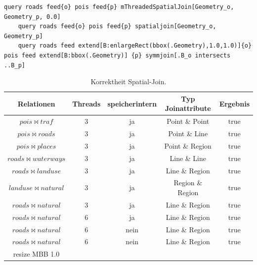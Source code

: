 \documentclass[a4paper,12pt,twoside]{article}
\newcommand{\Fb}[1]{\textit{#1}} %
\begin{document}
\begin{minipage}{0.95\textwidth}
	\begin{lstlisting}[caption={Beispiel Testqueries für den Spatial-Join-Operator ohne \Fb{project} und \Fb{sortby}.}, label=list:testspatialjoin]
	query roads feed{o} pois feed{p} mThreadedSpatialJoin[Geometry_o, Geometry_p, 0.0]
	query roads feed{o} pois feed{p} spatialjoin[Geometry_o, Geometry_p]
	query roads feed extend[B:enlargeRect(bbox(.Geometry),1.0,1.0)]{o} pois feed extend[B:bbox(.Geometry)] {p} symmjoin[.B_o intersects ..B_p]
	\end{lstlisting}
\end{minipage}


\begin{table}
	\centering
	\begin{tabular}{|c|c|c|c|c|}
		\hline
		\rowcolor{gray!30} 
		Relationen & Threads & speicherintern & Typ Joinattribute & Ergebnis \\ 
		\hline 
		$pois \bowtie traf$ & 3 & ja & Point \& Point & true \\ 
		\hline 
		$pois \bowtie roads$ & 3 & ja & Point \& Line & true \\ 
		\hline
		$pois \bowtie places$ & 3 & ja & Point \& Region & true \\ 
		\hline
		$roads \bowtie waterways$ & 3 & ja & Line \& Line & true \\ 
		\hline
		$roads \bowtie landuse$ & 3 & ja & Line \& Region & true \\ 
		\hline
		$landuse \bowtie natural$ & 3 & ja & Region \& Region & true \\ 
		\hline
		$roads \bowtie natural$ & 3 & ja & Line \& Region & true \\ 
		\hline
		$roads \bowtie natural$ & 6 & ja & Line \& Region & true \\ 
		\hline
		$roads \bowtie natural$ & 6 & nein & Line \& Region & true \\ 
		\hline
		$roads \bowtie natural$ & 6 & nein & Line \& Region & true \\ 
		resize MBB 1.0 &  &  &  &  \\ 
		\hline
	\end{tabular}
	\caption{\label{tab:testSpatial}Korrektheit Spatial-Join.}
\end{table}
 
\end{document}
